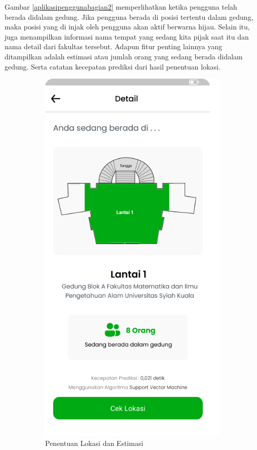 \begin{enumerate}[a.]
	      \par Gambar \ref{aplikasipenggunabagian2} memperlihatkan ketika pengguna telah berada didalam gedung. Jika pengguna berada di posisi tertentu dalam gedung, maka posisi yang di injak oleh pengguna akan aktif berwarna hijau. Selain itu, juga menampilkan informasi nama tempat yang sedang kita pijak saat itu dan nama detail dari fakultas tersebut. Adapun fitur penting lainnya yang ditampilkan adalah estimasi atau jumlah orang yang sedang berada didalam gedung. Serta catatan kecepatan prediksi dari hasil penentuan lokasi.


	      \vspace{-0cm}
	      \begin{figure} [H]
		      \begin{subfigure}{.5\textwidth}
			      \centering
			      \includegraphics[width=.5\linewidth]{gambar/applantai1.png}
			      \caption{Penentuan Lokasi dan Estimasi}
		      \end{subfigure}
		      \begin{subfigure}{.5\textwidth}
			      \centering

\end{subfigure}
\end{figure}
\end{enumerate}
